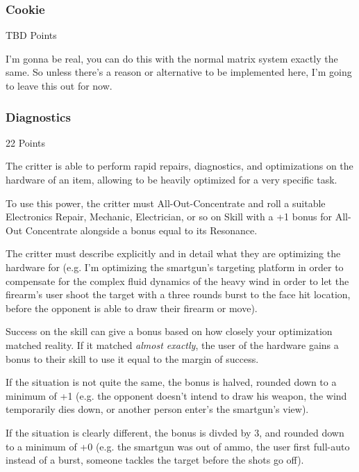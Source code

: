 \begin{multicols*}{3}
	\subsubsection{Cookie}\label{cookie}
	\begin{flushright}
		TBD Points
	\end{flushright}

	I'm gonna be real, you can do this with the normal matrix system exactly the same. So unless there's a reason or alternative to be implemented here, I'm going to leave this out for now.

	\subsubsection{Diagnostics}\label{diagnostics}
	\begin{flushright}
		22 Points
	\end{flushright}

	The critter is able to perform rapid repairs, diagnostics, and optimizations on the hardware of an item, allowing to be heavily optimized for a very specific task.
	
	To use this power, the critter must All-Out-Concentrate and roll a suitable Electronics Repair, Mechanic, Electrician, or so on Skill with a +1 bonus for All-Out Concentrate alongside a bonus equal to its Resonance. 
	
	The critter must describe explicitly and in detail what they are optimizing the hardware for (e.g. I'm optimizing the smartgun's targeting platform in order to compensate for the complex fluid dynamics of the heavy wind in order to let the firearm's user shoot the target with a three rounds burst to the face hit location, before the opponent is able to draw their firearm or move). 
	
	Success on the skill can give a bonus based on how closely your optimization matched reality. If it matched \textit{almost exactly}, the user of the hardware gains a bonus to their skill to use it equal to the margin of success. 
	
	If the situation is not quite the same, the bonus is halved, rounded down to a minimum of +1 (e.g. the opponent doesn't intend to draw his weapon, the wind temporarily dies down, or another person enter's the smartgun's view). 
	
	If the situation is clearly different, the bonus is divded by 3, and rounded down to a minimum of +0 (e.g. the smartgun was out of ammo, the user first full-auto instead of a burst, someone tackles the target before the shots go off).
	

\end{multicols*}
